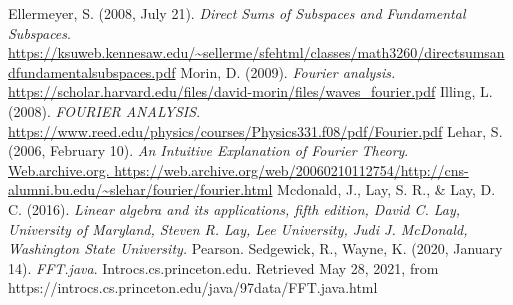 \documentclass[12pt]{article}
\begin{document}
    \begin{thebibliography}{4}
         Ellermeyer, S. (2008, July 21). \emph{Direct Sums of Subspaces and Fundamental Subspaces}. \url{https://ksuweb.kennesaw.edu/~sellerme/sfehtml/classes/math3260/directsumsandfundamentalsubspaces.pdf}
         Morin, D. (2009). \emph{Fourier analysis.} \url{https://scholar.harvard.edu/files/david-morin/files/waves_fourier.pdf}
         Illing, L. (2008). \emph{FOURIER ANALYSIS}. \url{https://www.reed.edu/physics/courses/Physics331.f08/pdf/Fourier.pdf}
         Lehar, S. (2006, February 10). \emph{An Intuitive Explanation of Fourier Theory}. \url{Web.archive.org. https://web.archive.org/web/20060210112754/http://cns-alumni.bu.edu/~slehar/fourier/fourier.html}
     Mcdonald, J., Lay, S. R., \& Lay, D. C. (2016). \emph{Linear algebra and its applications, fifth edition, David C. Lay, University of Maryland, Steven R. Lay, Lee University, Judi J. McDonald, Washington State University.} Pearson.
     Sedgewick, R., Wayne, K. (2020, January 14). \emph{FFT.java}. Introcs.cs.princeton.edu. Retrieved May 28, 2021, from https://introcs.cs.princeton.edu/java/97data/FFT.java.html
    \end{thebibliography}
\end{document}
